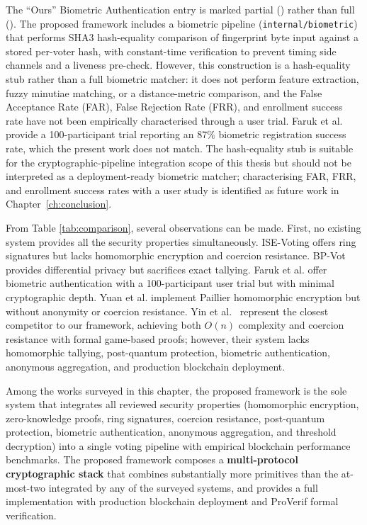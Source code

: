 The ``Ours'' Biometric Authentication entry is marked partial (\pmark) rather than full (\cmark). The proposed framework includes a biometric pipeline (\texttt{internal/biometric}) that performs SHA3 hash-equality comparison of fingerprint byte input against a stored per-voter hash, with constant-time verification to prevent timing side channels and a liveness pre-check. However, this construction is a hash-equality stub rather than a full biometric matcher: it does not perform feature extraction, fuzzy minutiae matching, or a distance-metric comparison, and the False Acceptance Rate (FAR), False Rejection Rate (FRR), and enrollment success rate have not been empirically characterised through a user trial. Faruk et al.~\cite{faruk2024} provide a 100-participant trial reporting an 87\% biometric registration success rate, which the present work does not match. The hash-equality stub is suitable for the cryptographic-pipeline integration scope of this thesis but should not be interpreted as a deployment-ready biometric matcher; characterising FAR, FRR, and enrollment success rates with a user study is identified as future work in Chapter~\ref{ch:conclusion}.

From Table \ref{tab:comparison}, several observations can be made. First, no existing system provides all the security properties simultaneously. ISE-Voting offers ring signatures but lacks homomorphic encryption and coercion resistance. BP-Vot provides differential privacy but sacrifices exact tallying. Faruk et al. offer biometric authentication with a 100-participant user trial but with minimal cryptographic depth. Yuan et al. implement Paillier homomorphic encryption but without anonymity or coercion resistance. Yin et al.~\cite{yin_tdsc} represent the closest competitor to our framework, achieving both $O(n)$ complexity and coercion resistance with formal game-based proofs; however, their system lacks homomorphic tallying, post-quantum protection, biometric authentication, anonymous aggregation, and production blockchain deployment.

Among the works surveyed in this chapter, the proposed framework is the sole system that integrates all reviewed security properties (homomorphic encryption, zero-knowledge proofs, ring signatures, coercion resistance, post-quantum protection, biometric authentication, anonymous aggregation, and threshold decryption) into a single voting pipeline with empirical blockchain performance benchmarks. The proposed framework composes a \textbf{multi-protocol cryptographic stack} that combines substantially more primitives than the at-most-two integrated by any of the surveyed systems, and provides a full implementation with production blockchain deployment and ProVerif formal verification.

